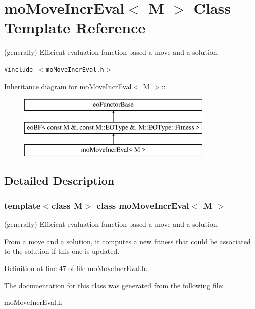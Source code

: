 \section{moMoveIncrEval$<$ M $>$ Class Template Reference}
\label{classmo_move_incr_eval}
(generally) Efficient evaluation function based a move and a solution.  


{\tt \#include $<$moMoveIncrEval.h$>$}

Inheritance diagram for moMoveIncrEval$<$ M $>$::\begin{figure}[H]
\begin{center}
\leavevmode
\includegraphics[height=3cm]{classmo_move_incr_eval}
\end{center}
\end{figure}


\subsection{Detailed Description}
\subsubsection*{template$<$class M$>$ class moMoveIncrEval$<$ M $>$}

(generally) Efficient evaluation function based a move and a solution. 

From a move and a solution, it computes a new fitness that could be associated to the solution if this one is updated. 



Definition at line 47 of file moMoveIncrEval.h.

The documentation for this class was generated from the following file:\begin{CompactItemize}
\item 
moMoveIncrEval.h\end{CompactItemize}
